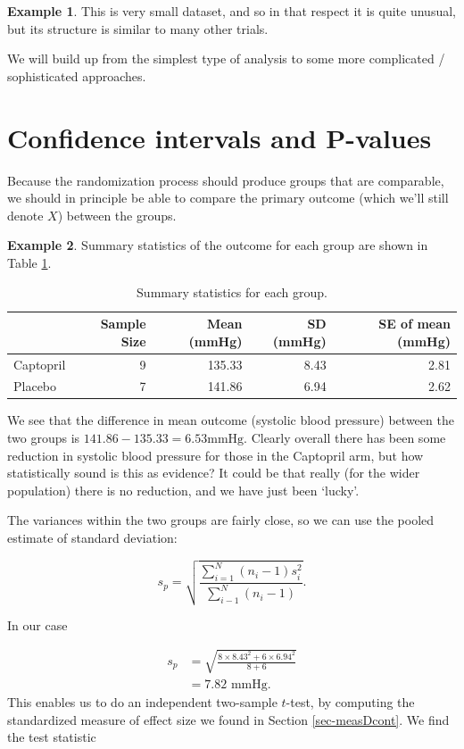 \documentclass[
  openany]{book}
\theoremstyle{definition}
\theoremstyle{definition}
\newtheorem{example}{Example}[chapter]
\theoremstyle{definition}
\theoremstyle{definition}
\theoremstyle{remark}
\begin{document}
\begin{example}
This is very small dataset, and so in that respect it is quite unusual, but its structure is similar to many other trials.
\end{example}

We will build up from the simplest type of analysis to some more complicated / sophisticated approaches.

\section{Confidence intervals and P-values}\label{ttest}

Because the randomization process should produce groups that are comparable, we should in principle be able to compare the primary outcome (which we'll still denote \(X\)) between the groups.

\begin{example}
\protect\hypertarget{exm:captopril2}{}\label{exm:captopril2}Summary statistics of the outcome for each group are shown in Table \ref{tab:outsumhommel}.

\begin{table}

\caption{\label{tab:outsumhommel}Summary statistics for each group.}
\centering
\begin{tabular}[t]{l|r|r|r|r}
\hline
  & Sample Size & Mean (mmHg) & SD (mmHg) & SE of mean (mmHg)\\
\hline
Captopril & 9 & 135.33 & 8.43 & 2.81\\
\hline
Placebo & 7 & 141.86 & 6.94 & 2.62\\
\hline
\end{tabular}
\end{table}

We see that the difference in mean outcome (systolic blood pressure) between the two groups is \(141.86 - 135.33 = 6.53 \text{mmHg}\). Clearly overall there has been some reduction in systolic blood pressure for those in the Captopril arm, but how statistically sound is this as evidence? It could be that really (for the wider population) there is no reduction, and we have just been `lucky'.

The variances within the two groups are fairly close, so we can use the pooled estimate of standard deviation:

\[
  s_p = \sqrt{\frac{\sum\limits_{i=1}^N\left(n_i-1\right)s_i^2}{\sum\limits_{i-1}^N\left(n_i-1\right)}}.
\]

In our case

\[ 
  \begin{aligned}
s_p&= \sqrt{\frac{8\times{8.43^2} + 6 \times{6.94^2}}{8+6}}\\
& = 7.82\text{ mmHg.}
\end{aligned}
\]
This enables us to do an independent two-sample \(t\)-test, by computing the standardized measure of effect size we found in Section \ref{sec-measDcont}. We find the test statistic


\end{example}
\end{document}
